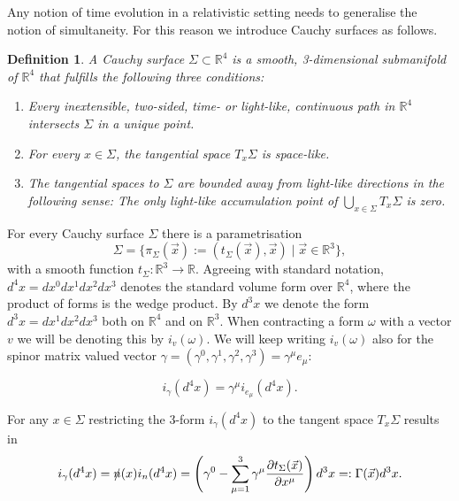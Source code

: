 \documentclass[b5paper,draft,openbib,12pt]{memoir}
\newtheorem{Def}{Definition}
\begin{document}
Any notion of time evolution in a relativistic setting needs to 
generalise the notion of simultaneity. For this reason we 
introduce Cauchy surfaces as follows.


\begin{Def}
  A Cauchy surface \(\Sigma\subset \mathbb{R}^4\) is a smooth, 
  3-dimensional submanifold of \(\mathbb{R}^4\) that fulfills
  the following three conditions:
  \begin{enumerate}[label=\alph*)]
  \item Every inextensible, two-sided, time- or light-like, continuous path in \(\mathbb{R}^4\) intersects \(\Sigma\) in a unique point.
  \item For every \(x\in\Sigma\), the tangential space \(T_x\Sigma\) is space-like.
  \item The tangential spaces to \(\Sigma\) are bounded away from light-like directions in the following sense: The only light-like accumulation point of 
  \(\bigcup_{x\in \Sigma} T_x \Sigma\) is zero.
  \end{enumerate}
\end{Def}

For every Cauchy surface \(\Sigma\) there is a parametrisation
\begin{equation}
\Sigma= \{ \pi_\Sigma(\vec{x}):=(t_\Sigma(\vec{x}),\vec{x})\mid \vec{x}\in\mathbb{R}^3\},
\end{equation}
with a smooth function 
\(t_\Sigma: \mathbb{R}^3\rightarrow \mathbb{R}\). 
Agreeing with standard notation, 
\(d^4x=dx^0dx^1dx^2dx^3\) denotes the standard volume form over 
\(\mathbb{R}^4\),
where the product of forms is 
the wedge product. By \(d^3x\) we denote 
the form \(d^3x=dx^1dx^2dx^3\) both on \(\mathbb{R}^4\) and 
on \(\mathbb{R}^3\). When contracting a form 
\(\omega\) with a vector \(v\) we 
will be denoting this by \(i_v(\omega)\). 
We will keep writing \(i_v(\omega)\) 
also for the spinor matrix valued 
vector \(\gamma= (\gamma^0,\gamma^1,\gamma^2,\gamma^3)
=\gamma^\mu e_\mu\):

\begin{equation}
i_\gamma(d^4x)=\gamma^\mu i_{e_\mu}(d^4x).
\end{equation}

For any \(x\in \Sigma\) restricting the 
3-form \(i_\gamma(d^4x)\) to the tangent space 
\(T_x\Sigma\) results in 
\begin{equation}
i_\gamma(d^4x)=\slashed{n}(x)i_n(d^4x)= \left(\gamma^0-\sum_{\mu=1}^3 \gamma^\mu \frac{\partial t_\Sigma (\vec{x})}{\partial x^\mu}\right) d^3x=:\Gamma(\vec{x})d^3x.
\end{equation}
\end{document}
